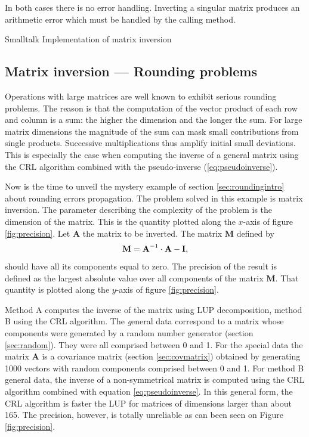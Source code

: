 In both cases there is no error handling. Inverting a singular
matrix produces an arithmetic error which must be handled by the
calling method.

\begin{listing}[label=lst:inversion]{Smalltalk}
{Implementation of matrix inversion}
%
%
\end{listing}

\subsection{Matrix inversion --- Rounding problems}
\label{sec:matrixrounding} Operations with large matrices are well
known to exhibit serious rounding problems. The reason is that the
computation of the vector product of each row and column is a sum:
the higher the dimension and the longer the sum. For large matrix
dimensions the magnitude of the sum can mask small contributions
from single products. Successive multiplications thus amplify
initial small deviations. This is especially the case when
computing the inverse of a general matrix using the CRL algorithm
combined with the pseudo-inverse (\ref{eq:pseudoinverse}).

Now is the time to unveil the mystery example of section
\ref{sec:roundingintro} about rounding errors propagation. The
problem solved in this example is matrix inversion. The parameter
describing the complexity of the problem is the dimension of the
matrix. This is the quantity plotted along the $x$-axis of figure
\ref{fig:precision}. Let $\textbf{A}$ the matrix to be inverted. The
matrix $\textbf{M}$ defined by
\begin{equation}
  \textbf{M}=\textbf{A}^{-1}\cdot\textbf{A}-\textbf{I},
\end{equation}
should have all its components equal to zero. The precision of the
result is defined as the largest absolute value over all
components of the matrix $\textbf{M}$. That quantity is plotted along
the $y$-axis of figure \ref{fig:precision}.

Method A computes the inverse of the matrix using LUP
decomposition, method B using the CRL algorithm. The {\textsl general}
data correspond to a matrix whose components were generated by a
random number generator (\cf section \ref{sec:random}). They were
all comprised between 0 and 1. For the {\textsl special} data the
matrix $\textbf{A}$ is a covariance matrix (\cf section
\ref{sec:covmatrix}) obtained by generating 1000 vectors with
random components comprised between 0 and 1. For method B general
data, the inverse of a non-symmetrical matrix is computed using
the CRL algorithm combined with equation \ref{eq:pseudoinverse}.
In this general form, the CRL algorithm is faster the LUP for
matrices of dimensions larger than about 165. The precision,
however, is totally unreliable as can been seen on Figure
\ref{fig:precision}.

